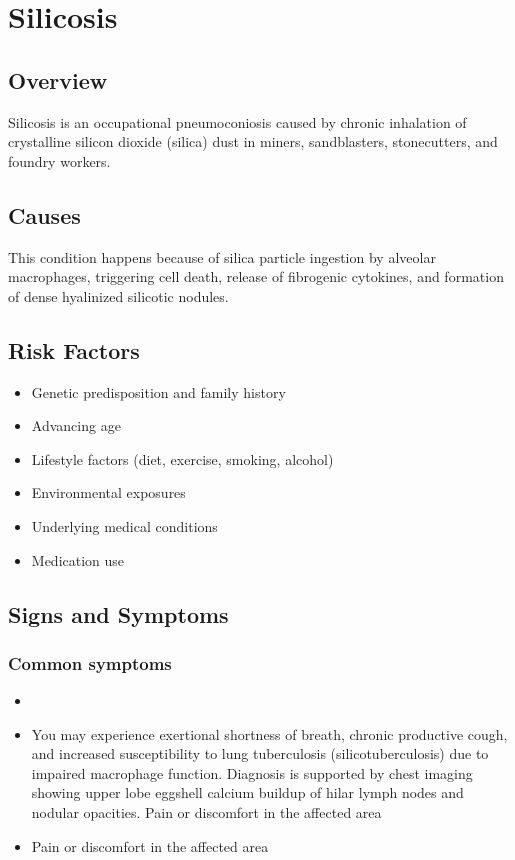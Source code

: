 \chapter{Silicosis}
\label{sec:Silicosis}

\section{Overview}
Silicosis is an occupational pneumoconiosis caused by chronic inhalation of crystalline silicon dioxide (silica) dust in miners, sandblasters, stonecutters, and foundry workers.
\section{Causes}
This condition happens because of silica particle ingestion by alveolar macrophages, triggering cell death, release of fibrogenic cytokines, and formation of dense hyalinized silicotic nodules.     
\section{Risk Factors}

\begin{itemize}[noitemsep]
  \item Genetic predisposition and family history
  \item Advancing age
  \item Lifestyle factors (diet, exercise, smoking, alcohol)
  \item Environmental exposures
  \item Underlying medical conditions
  \item Medication use
\end{itemize}
\section{Signs and Symptoms}

\subsection{Common symptoms}
\begin{itemize}[noitemsep]
  \item \item You may experience exertional shortness of breath, chronic productive cough, and increased susceptibility to lung tuberculosis (silicotuberculosis) due to impaired macrophage function. Diagnosis is supported by chest imaging showing upper lobe eggshell calcium buildup of hilar lymph nodes and nodular opacities. Pain or discomfort in the affected area    \item Pain or discomfort in the affected area
  \end{itemize}

